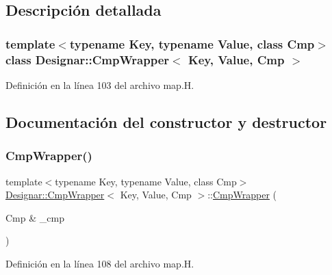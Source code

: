 \subsection{Descripción detallada}
\subsubsection*{template$<$typename Key, typename Value, class Cmp$>$\newline
class Designar\+::\+Cmp\+Wrapper$<$ Key, Value, Cmp $>$}



Definición en la línea 103 del archivo map.\+H.



\subsection{Documentación del constructor y destructor}
\mbox{\label{class_designar_1_1_cmp_wrapper_a2fe493e155e893254b689c5933c61ebb}} 
\subsubsection{\texorpdfstring{Cmp\+Wrapper()}{CmpWrapper()}\hspace{0.1cm}{\footnotesize\ttfamily [1/4]}}
{\footnotesize\ttfamily template$<$typename Key, typename Value, class Cmp$>$ \\
\hyperlink{class_designar_1_1_cmp_wrapper}{Designar\+::\+Cmp\+Wrapper}$<$ Key, Value, Cmp $>$\+::\hyperlink{class_designar_1_1_cmp_wrapper}{Cmp\+Wrapper} (\begin{DoxyParamCaption}\item[{Cmp \&}]{\+\_\+cmp }\end{DoxyParamCaption})\hspace{0.3cm}{\ttfamily [inline]}}



Definición en la línea 108 del archivo map.\+H.

\mbox{\label{class_designar_1_1_cmp_wrapper_af471969d033f9f7b5d306a0755af43c6}} 
